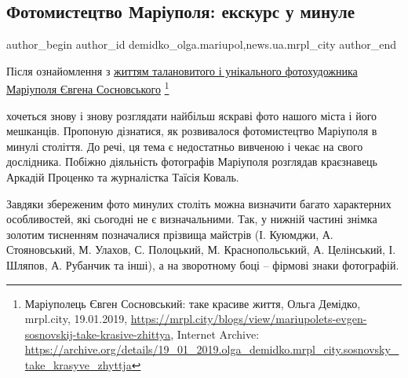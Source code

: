  
 
 
 
 
 
\subsection{Фотомистецтво Маріуполя: екскурс у минуле}
\label{sec:05_02_2019.stz.news.ua.mrpl_city.1.fotomystectvo_mrpl_ekskurs_v_mynule}
 
\ifcmt
 author_begin
   author_id demidko_olga.mariupol,news.ua.mrpl_city
 author_end
\fi


Після ознайомлення з \href{https://archive.org/details/19_01_2019.olga_demidko.mrpl_city.sosnovsky_take_krasyve_zhyttja}{%
життям талановитого і унікального фотохудожника Маріуполя Євгена Сосновського}
\footnote{Маріуполець Євген Сосновський: таке красиве життя, Ольга Демідко, mrpl.city, 19.01.2019, %
\url{https://mrpl.city/blogs/view/mariupolets-evgen-sosnovskij-take-krasive-zhittya}, %
Internet Archive: \url{https://archive.org/details/19_01_2019.olga_demidko.mrpl_city.sosnovsky_take_krasyve_zhyttja}%
}

хочеться знову і знову розглядати найбільш яскраві фото
нашого міста і його мешканців. Пропоную дізнатися, як розвивалося фотомистецтво
Маріуполя в минулі століття. До речі, ця тема є недостатньо вивченою і чекає на
свого дослідника. Побіжно діяльність фотографів Маріуполя розглядав краєзнавець
Аркадій Проценко та журналістка Таїсія Коваль.

Завдяки збереженим фото минулих століть можна визначити багато характерних
особливостей, які сьогодні не є визначальними. Так, у нижній частині знімка
золотим тисненням позначалися прізвища майстрів (І. Куюмджи, А. Стояновський,
М. Улахов, С. Полоцький, М. Краснопольський, А. Целінський, І. Шляпов, А.
Рубанчик та інші), а на зворотному боці – фірмові знаки фотографій.

